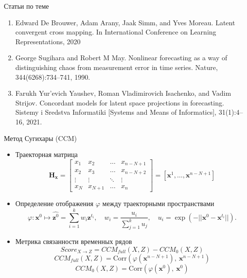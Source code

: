 \documentclass{beamer}
\newcommand{\bx}{\mathbf{x}}
\newcommand{\bz}{\mathbf{z}}
\newcommand{\dH}{\mathds{H}}
\begin{document}
	\begin{frame}{Статьи по теме}
		\begin{enumerate}
			\item Edward De Brouwer, Adam Arany, Jaak Simm, and Yves Moreau. Latent convergent
			cross mapping. In International Conference on Learning Representations, 2020
			\item George Sugihara and Robert M May. Nonlinear forecasting as a way of distinguishing
			chaos from measurement error in time series. Nature, 344(6268):734–741, 1990.
			\item Farukh Yur’evich Yaushev, Roman Vladimirovich Isachenko, and Vadim Strijov.
			Concordant models for latent space projections in forecasting. Sistemy i Sredstva
			Informatiki [Systems and Means of Informatics], 31(1):4–16, 2021.
		\end{enumerate}
	\end{frame}

	\begin{frame}{Метод Сугихары (CCM)}
		\begin{itemize}
			\item[] Траекторная матрица
			\[ \textbf{H}_{\bx} = \begin{bmatrix}
				x_1 & x_2 & \ldots & x_{n-N+1} \\
				x_2 & x_3 & \ldots & x_{n-N+2} \\
				\vdots & \vdots & \ddots & \vdots \\
				x_{N} & x_{N+1} & \ldots & x_n
			\end{bmatrix} = [\bx^1, \ldots, \bx^{n-N+1}] \]
		
			\item[] Определение отображения $\varphi$ между траекторными пространствами
			\[ \varphi: \bx^0 \mapsto \widehat{\bz^0} = \sum\limits_{i=1}^k w_i \bz^{t_i}, \quad 
			w_i = \dfrac{u_i}{\sum\limits_{j=1}^k u_j}, \quad
			u_i = \exp(-||\bx^0 - \bx^{t_i}||). \]
			
			
			\item[] Метрика связанности временных рядов
			\[ Score_{X \rightarrow Z} = CCM_{full}(X, Z) - CCM_0(X, Z) \]
			\[ CCM_{full}(X, Z) = \text{Corr}(\varphi(\bx^{n-N+1}), \: \bx^{n-N+1})\]
			\[ CCM_0(X, Z) = \text{Corr}(\varphi(\bx^0), \: \bx^0)\]
		\end{itemize}
	\end{frame}
\end{document}
